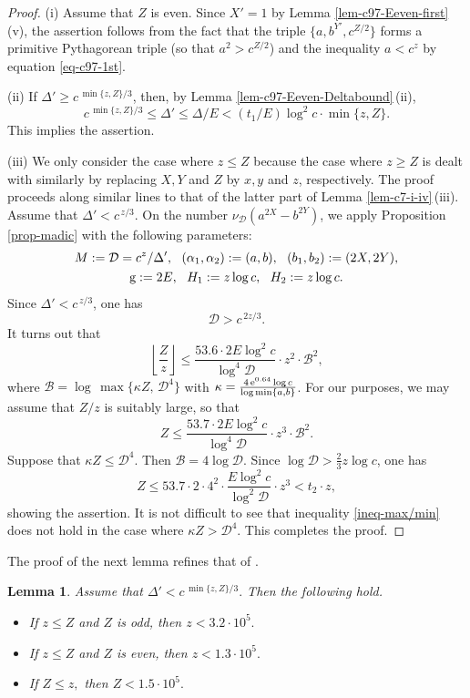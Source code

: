 \documentclass[11pt]{amsart}
\newtheorem{lem}{Lemma}[section]
\numberwithin{equation}{section}
\begin{document}
\begin{proof}
(i) Assume that $Z$ is even.
Since $X'=1$ by Lemma \ref{lem-c97-Eeven-first}\,(v), the assertion follows from the fact that the triple $\{a,b^{Y'},c^{Z/2}\}$ forms a primitive Pythagorean triple (so that $a^2>c^{Z/2}$) and the inequality $a<c^z$ by equation \eqref{eq-c97-1st}.
\par
(ii) If $\Delta' \ge c^{\,\min\{z,Z\}/3}$, then, by Lemma \ref{lem-c97-Eeven-Deltabound}\,(ii),
\[
c^{\,\min\{z,Z\}/3} \le \Delta' \le \Delta/E < (t_1/E) \log^2 c \cdot \min\{z,Z\}.
\]
This implies the assertion. 
\par
(iii) We only consider the case where $z \le Z$ because the case where $z \ge Z$ is dealt with similarly by replacing $X,Y$ and $Z$ by $x,y$ and $z$, respectively.
The proof proceeds along similar lines to that of the latter part of Lemma \ref{lem-c7-i-iv}\,(iii).
Assume that $\Delta'<c^{\,z/3}$.
On the number $\nu_{\mathcal D}(a^{2X}-b^{2Y})$, we apply Proposition \ref{prop-madic} with the following parameters:
\begin{gather*}
M:=\mathcal D=c^{z}/\Delta', \ \  (\alpha_1,\alpha_2):=(a,b), \ \ (b_1,b_2):=(2X,2Y), \\
{\rm g}:=2E, \ \ H_1:=z \log c, \ \ H_2:= z \log c.
\end{gather*}
Since $\Delta'<c^{\,z/3}$, one has
\[
\mathcal D > c^{\,2z/3}.
\]
It turns out that
\[
\left \lfloor \frac{Z}{z} \right \rfloor \le \frac{53.6 \cdot 2 E\log^2 c}{\log^4 \mathcal D} \cdot z^2 \cdot \mathcal B^2,
\]
where $\mathcal B = \log\,\max \{\kappa Z,\,\mathcal D^4\}$ with $\kappa=\frac{4\,{\rm e}^{0.64}\log c}{\log \min\{a,b\}}$.
For our purposes, we may assume that $Z/z$ is suitably large, so that
\begin{equation}\label{ineq-max/min}
Z \le \frac{53.7 \cdot 2 E\log^2 c}{\log^4 \mathcal D} \cdot z^3 \cdot {\mathcal B}^2.
\end{equation}
Suppose that $\kappa Z \le \mathcal D^4$.
Then $\mathcal B=4\log \mathcal D$.
Since $\log \mathcal D > \frac{2}{3}z \log c$, one has
\[
Z \le 53.7 \cdot 2 \cdot 4^2 \cdot \frac{E\log^2 c}{\log^2 \mathcal D} \cdot z^3 < t_2 \cdot z,
\]
showing the assertion.
It is not difficult to see that inequality \eqref{ineq-max/min} does not hold in the case where $\kappa Z>{\mathcal D}^4$.
This completes the proof.
\end{proof}

The proof of the next lemma refines that of \cite[Lemma 8.4]{MP2}.

\begin{lem}\label{min<<1}
Assume that $\Delta'<c^{\,\min\{z,Z\}/3}.$
Then the following hold.
\begin{itemize}
\item[\rm (i)]
If $z \le Z$ and $Z$ is odd, then $z< 3.2 \cdot 10^5.$%
\item[\rm (ii)]
If $z \le Z$ and $Z$ is even, then $z< 1.3 \cdot 10^5.$%
\item[\rm (iii)]
If $Z \le z,$ then $Z< 1.5 \cdot 10^5.$
\end{itemize}
\end{lem}
\end{document}
